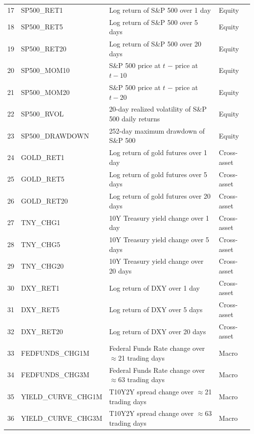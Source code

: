 \documentclass[12pt]{article}
\begin{document}
\begin{table}[H]
{\begin{tabular}{llll}
\midrule
17 & SP500\_RET1       & Log return of S\&P 500 over 1 day                          & Equity \\
18 & SP500\_RET5       & Log return of S\&P 500 over 5 days                         & Equity \\
19 & SP500\_RET20      & Log return of S\&P 500 over 20 days                        & Equity \\
20 & SP500\_MOM10      & S\&P 500 price at $t$ $-$ price at $t-10$                  & Equity \\
21 & SP500\_MOM20      & S\&P 500 price at $t$ $-$ price at $t-20$                  & Equity \\
22 & SP500\_RVOL       & 20-day realized volatility of S\&P 500 daily returns        & Equity \\
23 & SP500\_DRAWDOWN   & 252-day maximum drawdown of S\&P 500                       & Equity \\
\midrule
24 & GOLD\_RET1        & Log return of gold futures over 1 day                      & Cross-asset \\
25 & GOLD\_RET5        & Log return of gold futures over 5 days                     & Cross-asset \\
26 & GOLD\_RET20       & Log return of gold futures over 20 days                    & Cross-asset \\
27 & TNY\_CHG1         & 10Y Treasury yield change over 1 day                       & Cross-asset \\
28 & TNY\_CHG5         & 10Y Treasury yield change over 5 days                      & Cross-asset \\
29 & TNY\_CHG20        & 10Y Treasury yield change over 20 days                     & Cross-asset \\
30 & DXY\_RET1         & Log return of DXY over 1 day                               & Cross-asset \\
31 & DXY\_RET5         & Log return of DXY over 5 days                              & Cross-asset \\
32 & DXY\_RET20        & Log return of DXY over 20 days                             & Cross-asset \\
\midrule
33 & FEDFUNDS\_CHG1M   & Federal Funds Rate change over $\approx$21 trading days    & Macro \\
34 & FEDFUNDS\_CHG3M   & Federal Funds Rate change over $\approx$63 trading days    & Macro \\
35 & YIELD\_CURVE\_CHG1M & T10Y2Y spread change over $\approx$21 trading days      & Macro \\
36 & YIELD\_CURVE\_CHG3M & T10Y2Y spread change over $\approx$63 trading days      & Macro \\
\bottomrule
\end{tabular}}
\end{table}
\end{document}
